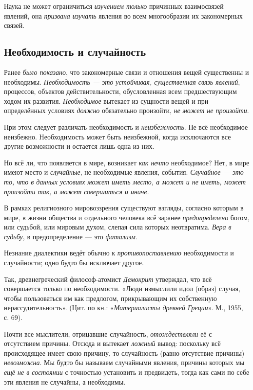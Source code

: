 \documentclass[a4paper,14pt,russian]{extreport}
\begin{document}
Наука не может ограничиться \emph{изучением только} причинных взаимосвязей явлений, она \emph{призвана изучать} явления во всем многообразии их закономерных связей.

\subsection{Необходимость и случайность}

Ранее \emph{было показано}, что закономерные связи и отношения вещей существенны и необходимы. \emph{Необходимость --- это устойчивая, существенная связь явлений}, процессов, объектов действительности, обусловленная всем предшествующим ходом их развития. \emph{Необходимое} вытекает из сущности вещей и при определённых условиях \emph{должно} обязательно произойти, \emph{не может не произойти}.

При этом следует различать необходимость и \emph{неизбежность}. Не всё необходимое неизбежно. Необходимость может быть неизбежной, когда исключаются все другие возможности и остается лишь одна из них.

Но всё ли, что появляется в мире, возникает \emph{как нечто} необходимое? Нет, в мире имеют место и \emph{случайные}, не необходимые явления, события. \emph{Случайное --- это то, что в данных условиях может иметь место, а может и не иметь, может произойти так, а может совершиться и иначе}.

В рамках религиозного мировоззрения существуют взгляды, согласно которым в мире, в жизни общества и отдельного человека всё заранее \emph{предопределено} богом, или судьбой, или мировым духом, слепая сила которых неотвратима. \emph{Вера в судьбу}, в предопределение --- это \emph{фатализм}.

Незнание диалектики ведёт обычно к \emph{противопоставлению} необходимости и случайности; одно будто бы исключает другое.

Так, древнегреческий философ-атомист \emph{Демокрит} утверждал, что всё совершается только по необходимости. «Люди измыслили идол (образ) случая, чтобы пользоваться им как предлогом, прикрывающим их собственную нерассудительность». (Цит. по кн.: «\emph{Материалисты древней Греции}». М., 1955, с. 69).

Почти все мыслители, отрицавшие случайность, \emph{отождествляли} её с отсутствием причины. Отсюда и вытекает \emph{ложный} вывод: поскольку всё происходящее имеет свою причину, то случайность (равно отсутствие причины) \emph{невозможна}. Мы будто бы называем случайными явления, причины которых мы \emph{ещё не в состоянии} с точностью установить и предвидеть, тогда как сами по себе эти явления не случайны, а необходимы.
\end{document}
